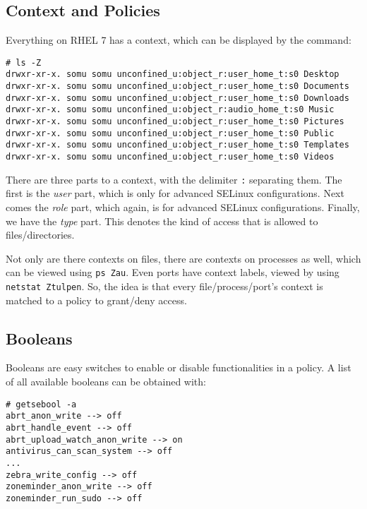 \subsection{Context and Policies}
Everything on RHEL 7 has a context, which can be displayed by the command:

\vspace{-15pt}
\begin{verbatim}
# ls -Z
drwxr-xr-x. somu somu unconfined_u:object_r:user_home_t:s0 Desktop
drwxr-xr-x. somu somu unconfined_u:object_r:user_home_t:s0 Documents
drwxr-xr-x. somu somu unconfined_u:object_r:user_home_t:s0 Downloads
drwxr-xr-x. somu somu unconfined_u:object_r:audio_home_t:s0 Music
drwxr-xr-x. somu somu unconfined_u:object_r:user_home_t:s0 Pictures
drwxr-xr-x. somu somu unconfined_u:object_r:user_home_t:s0 Public
drwxr-xr-x. somu somu unconfined_u:object_r:user_home_t:s0 Templates
drwxr-xr-x. somu somu unconfined_u:object_r:user_home_t:s0 Videos
\end{verbatim}
\vspace{-10pt}

\noindent
There are three parts to a context, with the delimiter \verb|:| separating them. The first is the \textit{user} part, which is only for advanced SELinux configurations. Next comes the \textit{role} part, which again, is for advanced SELinux configurations. Finally, we have the \textit{type} part. This denotes the kind of access that is allowed to files/directories. 

Not only are there contexts on files, there are contexts on processes as well, which can be viewed using \verb|ps Zau|. Even ports have context labels, viewed by using \verb|netstat Ztulpen|. So, the idea is that every file/process/port's context is matched to a policy to grant/deny access. 

\subsection{Booleans}
Booleans are easy switches to enable or disable functionalities in a policy. A list of all available booleans can be obtained with:

\vspace{-15pt}
\begin{verbatim}
# getsebool -a
abrt_anon_write --> off
abrt_handle_event --> off
abrt_upload_watch_anon_write --> on
antivirus_can_scan_system --> off
...
zebra_write_config --> off
zoneminder_anon_write --> off
zoneminder_run_sudo --> off
\end{verbatim}
\vspace{-10pt}

